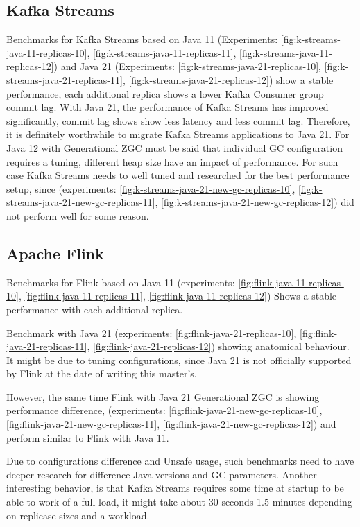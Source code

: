 \subsection{Kafka Streams}\label{subsec:kafka-streams}
Benchmarks for Kafka Streams based on Java 11 (Experiments: \ref{fig:k-streams-java-11-replicas-10},
\ref{fig:k-streams-java-11-replicas-11}, \ref{fig:k-streams-java-11-replicas-12})
and Java 21 (Experiments: \ref{fig:k-streams-java-21-replicas-10},
\ref{fig:k-streams-java-21-replicas-11}, \ref{fig:k-streams-java-21-replicas-12}) show a
stable performance, each additional replica shows a lower
Kafka Consumer group commit lag.
With Java 21, the performance of Kafka Streams has improved significantly,
commit lag shows show less latency and less commit lag.
Therefore, it is definitely worthwhile to migrate Kafka Streams
applications to Java 21.
For Java 12 with Generational ZGC must be said that individual GC
configuration requires a tuning, different heap size have an impact
of performance.
For such case Kafka Streams needs to well tuned and researched for
the best performance setup, since (experiments: \ref{fig:k-streams-java-21-new-gc-replicas-10},
\ref{fig:k-streams-java-21-new-gc-replicas-11}, \ref{fig:k-streams-java-21-new-gc-replicas-12})
did not perform well for some reason.

\subsection{Apache Flink}\label{subsec:ache-flink}
Benchmarks for Flink based on Java 11 (experiments: \ref{fig:flink-java-11-replicas-10},
\ref{fig:flink-java-11-replicas-11}, \ref{fig:flink-java-11-replicas-12})
Shows a stable performance with each additional replica.

Benchmark with Java 21 (experiments: \ref{fig:flink-java-21-replicas-10},
\ref{fig:flink-java-21-replicas-11}, \ref{fig:flink-java-21-replicas-12})
showing anatomical behaviour.
It might be due to tuning configurations, since Java 21 is not officially supported
by Flink at the date of writing this master's.

However, the same time Flink with Java 21 Generational ZGC is showing
performance difference, (experiments: \ref{fig:flink-java-21-new-gc-replicas-10},
\ref{fig:flink-java-21-new-gc-replicas-11}, \ref{fig:flink-java-21-new-gc-replicas-12})
and perform similar to Flink with Java 11.

Due to configurations difference and Unsafe usage, such benchmarks need to have
deeper research for difference Java versions and GC parameters.
Another interesting behavior, is that Kafka Streams requires some
time at startup to be able to work of a full load, it might take about 30 seconds
1.5 minutes depending on replicase sizes and a workload.

